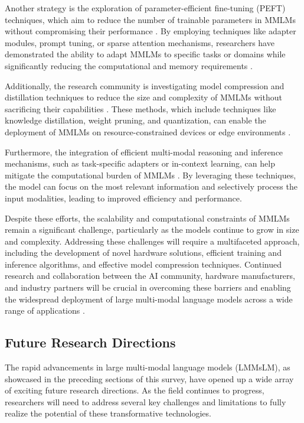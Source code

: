 \documentclass[11pt]{article}
\begin{document}
Another strategy is the exploration of parameter-efficient fine-tuning (PEFT) techniques, which aim to reduce the number of trainable parameters in MMLMs without compromising their performance \cite{ref339}. By employing techniques like adapter modules, prompt tuning, or sparse attention mechanisms, researchers have demonstrated the ability to adapt MMLMs to specific tasks or domains while significantly reducing the computational and memory requirements \cite{ref340}.

Additionally, the research community is investigating model compression and distillation techniques to reduce the size and complexity of MMLMs without sacrificing their capabilities \cite{ref341}. These methods, which include techniques like knowledge distillation, weight pruning, and quantization, can enable the deployment of MMLMs on resource-constrained devices or edge environments \cite{ref342}.

Furthermore, the integration of efficient multi-modal reasoning and inference mechanisms, such as task-specific adapters or in-context learning, can help mitigate the computational burden of MMLMs \cite{ref108}. By leveraging these techniques, the model can focus on the most relevant information and selectively process the input modalities, leading to improved efficiency and performance.

Despite these efforts, the scalability and computational constraints of MMLMs remain a significant challenge, particularly as the models continue to grow in size and complexity. Addressing these challenges will require a multifaceted approach, including the development of novel hardware solutions, efficient training and inference algorithms, and effective model compression techniques. Continued research and collaboration between the AI community, hardware manufacturers, and industry partners will be crucial in overcoming these barriers and enabling the widespread deployment of large multi-modal language models across a wide range of applications \cite{ref337}.

\subsection{Future Research Directions}

The rapid advancements in large multi-modal language models (LMMsLM), as showcased in the preceding sections of this survey, have opened up a wide array of exciting future research directions. As the field continues to progress, researchers will need to address several key challenges and limitations to fully realize the potential of these transformative technologies.
\end{document}
